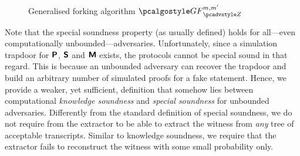 	\begin{figure}[t]
		\centering
\caption{Generalised forking algorithm $\genforking_{\zdv}^{m, m'}$
  }
	\label{fig:genforking_lemma}
\end{figure}


\fi



Note that the special soundness property (as usually defined) holds for
all---even computationally unbounded---adversaries. Unfortunately, since a
simulation trapdoor for $\bm{\mathsf{P}}$, $\bm{\mathsf{S}}$ and $\bm{\mathsf{M}}$ exists, the protocols
cannot be special sound in that regard. This is because an unbounded adversary
can recover the trapdoor and build an arbitrary number of simulated proofs for a fake
statement. Hence, we provide a weaker, yet sufficient, definition that somehow lies between 
computational \emph{knowledge soundness} and \emph{special soundness} for unbounded adversaries. Differently from the standard definition of special soundness, we do not require from the extractor to be able to extract the witness from \emph{any} tree of acceptable transcripts. Similar to knowledge soundness, we require that the extractor fails to reconstruct the witness with some small probability only. 

